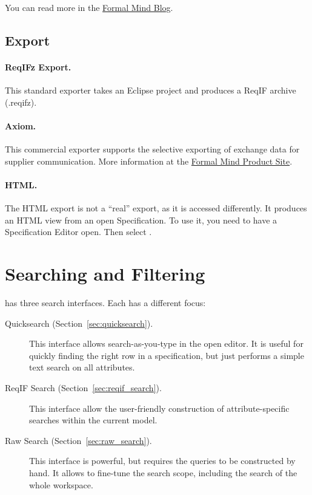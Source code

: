 You can read more in the \href{http://formalmind.com/blog/new-stuff-new-committer-new-product-new-importer-new-release}{Formal Mind Blog}.

\subsection{Export}

\paragraph{ReqIFz Export.} This standard exporter takes an Eclipse project and produces a ReqIF archive (.reqifz).

\paragraph{Axiom.} This commercial exporter supports the selective exporting of exchange data for supplier communication.  More information at the \href{http://formalmind.com/axiom}{Formal Mind Product Site}.

\paragraph{HTML.} The HTML export is not a ``real'' export, as it is accessed differently.  It produces an HTML view from an open Specification.  To use it, you need to have a Specification Editor open.  Then select .

\section{Searching and Filtering}
\label{sec:search}

\pror{} has three search interfaces.  Each has a different focus:

\begin{description}
\item[Quicksearch (Section~\ref{sec:quicksearch}).] This interface allows search-as-you-type in the open editor.  It is useful for quickly finding the right row in a specification, but just performs a simple text search on all attributes.
\item[ReqIF Search (Section~\ref{sec:reqif_search}).] This interface allow the user-friendly construction of attribute-specific searches within the current model.
\item[Raw Search (Section~\ref{sec:raw_search}).] This interface is powerful, but requires the queries to be constructed by hand.  It allows to fine-tune the search scope, including the search of the whole workspace.
\end{description}

